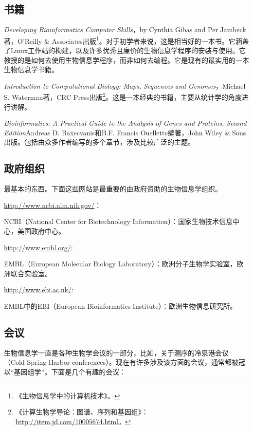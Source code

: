 \subsection{书籍}
\textit{Developing Bioinformatics Computer Skills}，by Cynthia Gibas and Per Jambeck著，O'Reilly \& Associates出版\footnote{《生物信息学中的计算机技术》。}。对于初学者来说，这是相当好的一本书。它涵盖了Linux工作站的构建，以及许多优秀且廉价的生物信息学程序的安装与使用。它教授的是如何去使用生物信息学程序，而非如何去编程。它是现有的最实用的一本生物信息学书籍。

\textit{Introduction to Computational Biology: Maps, Sequences and Genomes}，Michael S. Waterman著，CRC Press出版\footnote{《计算生物学导论：图谱、序列和基因组》：\href{http://item.jd.com/10005674.html}{http://item.jd.com/10005674.html}。}。这是一本经典的书籍，主要从统计学的角度进行讲解。

\textit{Bioinformatics: A Practical Guide to the Analysis of Genes and Proteins, Second Edition}Andreas D. Baxecvanis和B.F. Francis Ouellette编著，John Wiley \& Sons出版。包括由众多作者编写的多个章节，涉及比较广泛的主题。

\subsection{政府组织}
最基本的东西。下面这些网站是最重要的由政府资助的生物信息学组织。

\href{http://www.ncbi.nlm.nih.gov/}{http://www.ncbi.nlm.nih.gov/}：

\begin{adjustwidth}{1cm}{}
NCBI（National Center for Biotechnology Information）：国家生物技术信息中心，美国政府中心。
\end{adjustwidth}

\href{http://www.embl.org/}{http://www.embl.org/}:

\begin{adjustwidth}{1cm}{}
EMBL（European Molecular Biology Laboratory）：欧洲分子生物学实验室，欧洲联合实验室。
\end{adjustwidth}

\href{http://www.ebi.ac.uk/}{http://www.ebi.ac.uk/}:

\begin{adjustwidth}{1cm}{}
EMBL中的EBI（European Bioinformatics Institute）：欧洲生物信息研究所。
\end{adjustwidth}

\subsection{会议}
生物信息学一直是各种生物学会议的一部分，比如，关于测序的冷泉港会议（Cold Spring Harbor conferences）。现在有许多涉及该方面的会议，通常都被冠以“基因组学”。下面是几个有趣的会议：

